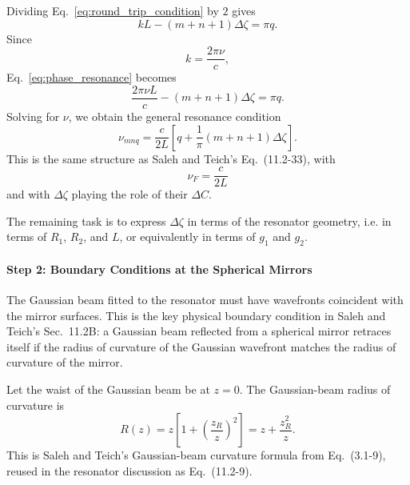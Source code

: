 \begin{resolucao}[Solution]
        Dividing Eq.~\eqref{eq:round_trip_condition} by $2$ gives
        \begin{equation}
            kL
            -
            (m+n+1)\Delta\zeta
            =
            \pi q.
            \label{eq:phase_resonance}
        \end{equation}
        Since
        \begin{equation}
            k=\frac{2\pi\nu}{c},
        \end{equation}
        Eq.~\eqref{eq:phase_resonance} becomes
        \begin{equation}
            \frac{2\pi\nu L}{c}
            -
            (m+n+1)\Delta\zeta
            =
            \pi q.
        \end{equation}
        Solving for $\nu$, we obtain the general resonance condition
        \begin{equation}
            \nu_{mnq}
            =
            \frac{c}{2L}
            \left[
                q
                +
                \frac{1}{\pi}
                (m+n+1)\Delta\zeta
            \right].
            \label{eq:nu_general}
        \end{equation}
        This is the same structure as Saleh and Teich's Eq.~(11.2-33), with
        \[
            \nu_F=\frac{c}{2L}
        \]
        and with $\Delta\zeta$ playing the role of their $\Delta C$.

        The remaining task is to express $\Delta\zeta$ in terms of the resonator geometry, i.e. in terms of $R_1$, $R_2$, and $L$, or equivalently in terms of $g_1$ and $g_2$.

    \paragraph*{Step 2: Boundary Conditions at the Spherical Mirrors}
        The Gaussian beam fitted to the resonator must have wavefronts coincident with the mirror surfaces. This is the key physical boundary condition in Saleh and Teich's Sec.~11.2B: a Gaussian beam reflected from a spherical mirror retraces itself if the radius of curvature of the Gaussian wavefront matches the radius of curvature of the mirror.

        Let the waist of the Gaussian beam be at $z=0$. The Gaussian-beam radius of curvature is
        \begin{equation}
            R(z)
            =
            z
            \left[
                1+
                \left(
                    \frac{z_R}{z}
                \right)^2
            \right]
            =
            z+\frac{z_R^2}{z}.
            \label{eq:gaussian_curvature}
        \end{equation}
        This is Saleh and Teich's Gaussian-beam curvature formula from Eq.~(3.1-9), reused in the resonator discussion as Eq.~(11.2-9).


\end{resolucao}
